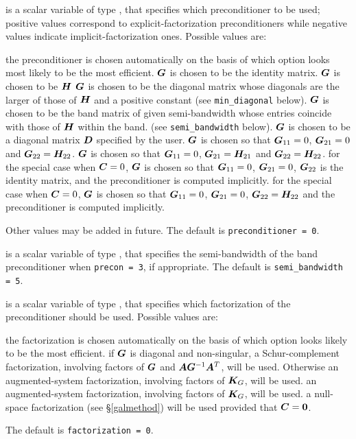 \documentclass{galahad}
\begin{document}
\begin{description}
 is a scalar variable of type \integer,
that specifies which preconditioner to be used;
positive values correspond to explicit-factorization preconditioners
while negative values indicate implicit-factorization ones. Possible values are:

\begin{description}
 the preconditioner is chosen automatically on the basis of which option
        looks most likely to be the most efficient.
 ${\bm{G}}$ is chosen to be the identity matrix.
 ${\bm{G}}$ is chosen to be ${\bm{H}}$
 ${\bm{G}}$ is chosen to be the diagonal matrix whose diagonals
        are the larger of those of ${\bm{H}}$ and a positive constant
        (see {\tt min\_diagonal} below).
 ${\bm{G}}$ is chosen to be the band matrix of given semi-bandwidth
        whose entries coincide with those of ${\bm{H}}$ within the band.
        (see {\tt semi\_bandwidth} below).
 ${\bm{G}}$ is chosen to be a diagonal matrix ${\bm{D}}$ specified by the
        user.
 ${\bm{G}}$ is chosen so that ${\bm{G}}_{11} = 0$, ${\bm{G}}_{21} = 0$
        and ${\bm{G}}_{22} = {\bm{H}}_{22}$.
 ${\bm{G}}$ is chosen so that ${\bm{G}}_{11} = 0$, ${\bm{G}}_{21} = {\bm{H}}_{21}$
        and ${\bm{G}}_{22} = {\bm{H}}_{22}$.
 for the special case when ${\bm{C}} = 0$,
        ${\bm{G}}$ is chosen so that ${\bm{G}}_{11} = 0$, ${\bm{G}}_{21} = 0$,
        ${\bm{G}}_{22}$ is the identity matrix, and the preconditioner is computed
        implicitly.
 for the special case when ${\bm{C}} = 0$,
        ${\bm{G}}$ is chosen so that ${\bm{G}}_{11} = 0$, ${\bm{G}}_{21} = 0$,
        ${\bm{G}}_{22} = {\bm{H}}_{22}$ and the preconditioner is computed
        implicitly.
\end{description}
Other values may be added in future.
The default is {\tt preconditioner = 0}.

 is a scalar variable of type \integer, that
specifies the semi-bandwidth of the band preconditioner when {\tt precon = 3},
if appropriate.
The default is {\tt semi\_bandwidth = 5}.

 is a scalar variable of type \integer, that
specifies which factorization of the preconditioner should be used.
Possible values are:

\begin{description}
 the factorization is chosen automatically on the basis of which option
        looks likely to be the most efficient.
 if ${\bm{G}}$ is diagonal and non-singular, a Schur-complement
        factorization, involving factors of ${\bm{G}}$ and ${\bm{A}} {\bm{G}}^{-1} {\bm{A}}^T$,
        will be used. Otherwise an augmented-system factorization, involving
        factors of ${\bm{K}}_G$, will be used.
 an augmented-system factorization, involving factors of ${\bm{K}}_G$,
        will be used.
 a null-space factorization (see \S\ref{galmethod}) will be used
provided that ${\bm{C}} = {\bm{0}}$.
\end{description}
The default is {\tt factorization = 0}.


\end{description}
\end{document}
